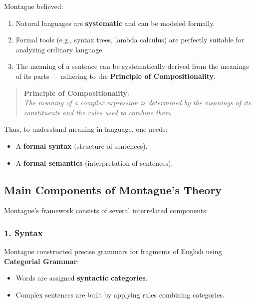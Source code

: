 \documentclass[12pt]{article}
\newcommand{\tightlist}{\itemsep 0pt\parskip 0pt\parsep 0pt}
\begin{document}
Montague believed:

\begin{enumerate}
\def\labelenumi{\arabic{enumi}.}
\tightlist
\item
  Natural languages are \textbf{systematic} and can be modeled formally.
\item
  Formal tools (e.g., syntax trees, lambda calculus) are perfectly
  suitable for analyzing ordinary language.
\item
  The meaning of a sentence can be systematically derived from the
  meanings of its parts --- adhering to the \textbf{Principle of
  Compositionality}.
\end{enumerate}

\begin{quote}
\textbf{Principle of Compositionality}:\\
\emph{The meaning of a complex expression is determined by the meanings
of its constituents and the rules used to combine them.}
\end{quote}

Thus, to understand meaning in language, one needs:

\begin{itemize}
\tightlist
\item
  A \textbf{formal syntax} (structure of sentences).
\item
  A \textbf{formal semantics} (interpretation of sentences).
\end{itemize}

\hypertarget{main-components-of-montagues-theory}{%
\subsection{Main Components of Montague's
Theory}\label{main-components-of-montagues-theory}}

Montague's framework consists of several interrelated components:

\hypertarget{syntax}{%
\subsubsection{\texorpdfstring{1.
\textbf{Syntax}}{1. Syntax}}\label{syntax}}

Montague constructed precise grammars for fragments of English using
\textbf{Categorial Grammar}:

\begin{itemize}
\tightlist
\item
  Words are assigned \textbf{syntactic categories}.
\item
  Complex sentences are built by applying rules combining categories.
\end{itemize}
\end{document}

